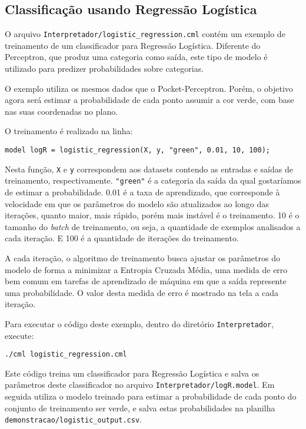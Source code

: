 \documentclass[12pt]{article}
\begin{document}
\subsection{Classificação usando Regressão Logística}

O arquivo \texttt{Interpretador/logistic\_regression.cml} contém um exemplo de treinamento de um classificador para Regressão Logística. Diferente do Perceptron, que produz uma categoria como saída, este tipo de modelo é utilizado para predizer probabilidades sobre categorias.

O exemplo utiliza os mesmos dados que o Pocket-Perceptron. Porém, o objetivo agora será estimar a probabilidade de cada ponto assumir a cor verde, com base nas suas coordenadas no plano.

O treinamento é realizado na linha:

\begin{verbatim}
model logR = logistic_regression(X, y, "green", 0.01, 10, 100);
\end{verbatim}

Nesta função, \texttt{X} e \texttt{y} correspondem aos datasets contendo as entradas e saídas de treinamento, respectivamente. \texttt{"green"} é a categoria da saída da qual gostaríamos de estimar a probabilidade. 0.01 é a taxa de aprendizado, que corresponde à velocidade em que os parâmetros do modelo são atualizados ao longo das iterações, quanto maior, mais rápido, porém mais instável é o treinamento. 10 é o tamanho do \textit{batch} de treinamento, ou seja, a quantidade de exemplos analisados a cada iteração. E 100 é a quantidade de iterações do treinamento.

A cada iteração, o algoritmo de treinamento busca ajustar os parâmetros do modelo de forma a minimizar a Entropia Cruzada Média, uma medida de erro bem comum em tarefas de aprendizado de máquina em que a saída represente uma probabilidade. O valor desta medida de erro é mostrado na tela a cada iteração.

Para executar o código deste exemplo, dentro do diretório \texttt{Interpretador}, execute:

\begin{verbatim}
./cml logistic_regression.cml
\end{verbatim}

Este código treina um classificador para Regressão Logística e salva os parâmetros deste classificador no arquivo \texttt{Interpretador/logR.model}. Em seguida utiliza o modelo treinado para estimar a probabilidade de cada ponto do conjunto de treinamento ser verde, e salva estas probabilidades na planilha \texttt{demonstracao/logistic\_output.csv}.
\end{document}
